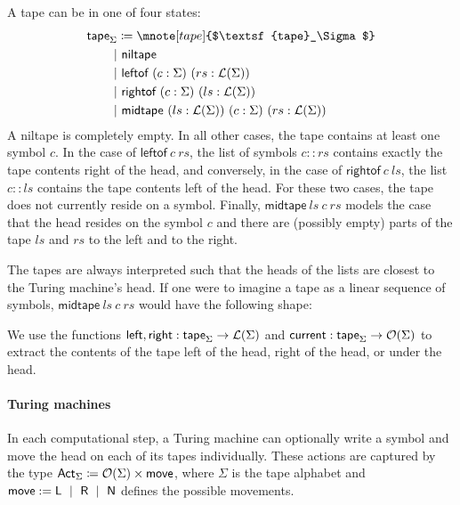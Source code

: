 A tape can be in one of four states:
\begin{align*}
  \textsf{tape}_\Sigma &  \defeq \mnote[tape]{$\textsf{tape}_\Sigma$}\\
  |&~\textsf{niltape} \\
  |&~\textsf{leftof}~(c : \Sigma)~(rs : \listsof{\Sigma}) \\
  |&~\textsf{rightof}~(c : \Sigma)~(ls : \listsof{\Sigma}) \\
  |&~\textsf{midtape}~(ls : \listsof{\Sigma})~(c : \Sigma)~(rs : \listsof{\Sigma})
\end{align*}
A \textsf{niltape} is completely empty. In all other cases, the tape contains at least one symbol $c$. 
In the case of $\textsf{leftof}~c~rs$, the list of symbols $c::rs$ contains exactly the tape contents right of the head, and conversely, in the case of $\textsf{rightof}~c~ls$, the list $c::ls$ contains the tape contents left of the head. For these two cases, the tape does not currently reside on a symbol.
Finally, $\textsf{midtape}~ls~c~rs$ models the case that the head resides on the symbol $c$ and there are (possibly empty) parts of the tape $ls$ and $rs$ to the left and to the right.

The tapes are always interpreted such that the heads of the lists are closest to the Turing machine's head. If one were to imagine a tape as a linear sequence of symbols, $\textsf{midtape}~ls~c~rs$ would have the following shape: 
\begin{center}
\end{center}

We use the functions $\textsf{left}, \textsf{right} : \textsf{tape}_\Sigma \rightarrow \mathcal{L} (\Sigma)$ and $\textsf{current} : \textsf{tape}_\Sigma \rightarrow \mathcal{O}{(\Sigma)}$ to extract the contents of the tape left of the head, right of the head, or under the head. 

\paragraph{Turing machines}
In each computational step, a Turing machine can optionally write a symbol and move the head on each of its tapes individually. These actions are captured by the type  $\textsf{Act}_{\Sigma} \coloneqq{} \mathcal{O}{(\Sigma)} \times \textsf{move}$, where $\Sigma$ is the tape alphabet and 
$\textsf{move} := \textsf{L} ~\mid~ \textsf{R} ~\mid~ \textsf{N}$
defines the possible movements. 

